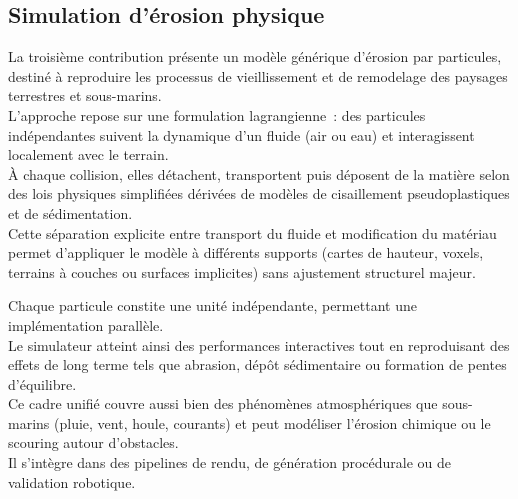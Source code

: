\subsection*{Simulation d'érosion physique}
La troisième contribution présente un modèle générique d'érosion par particules, destiné à reproduire les processus de vieillissement et de remodelage des paysages terrestres et sous-marins. \\
L'approche repose sur une formulation lagrangienne~: des particules indépendantes suivent la dynamique d'un fluide (air ou eau) et interagissent localement avec le terrain. \\
À chaque collision, elles détachent, transportent puis déposent de la matière selon des lois physiques simplifiées dérivées de modèles de cisaillement pseudoplastiques et de sédimentation. \\
Cette séparation explicite entre transport du fluide et modification du matériau permet d'appliquer le modèle à différents supports (cartes de hauteur, voxels, terrains à couches ou surfaces implicites) sans ajustement structurel majeur.

Chaque particule constite une unité indépendante, permettant une implémentation parallèle. \\
Le simulateur atteint ainsi des performances interactives tout en reproduisant des effets de long terme tels que abrasion, dépôt sédimentaire ou formation de pentes d'équilibre. \\
Ce cadre unifié couvre aussi bien des phénomènes atmosphériques que sous-marins (pluie, vent, houle, courants) et peut modéliser l'érosion chimique ou le scouring autour d'obstacles. \\
Il s'intègre dans des pipelines de rendu, de génération procédurale ou de validation robotique.

